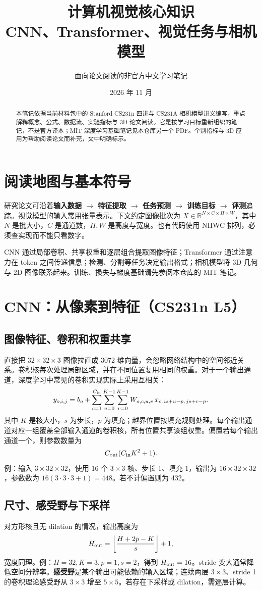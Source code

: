 \documentclass[11pt,a4paper,fontset=none]{ctexart}
\title{\vspace{-1.4cm}\textbf{计算机视觉核心知识}\\\large CNN、Transformer、视觉任务与相机模型}
\author{面向论文阅读的非官方中文学习笔记}
\date{2026 年 11 月}
\newcommand{\R}{\mathbb{R}}
\begin{document}
\maketitle
\begin{abstract}
本笔记依据当前材料包中的 Stanford CS231n 四讲与 CS231A 相机模型讲义编写，重点解释概念、公式、数据流、实验指标与 3D 论文阅读。它是按学习目标重新组织的笔记，不是官方译本；MIT 深度学习基础笔记见本仓库另一个 PDF。个别指标与 3D 应用为帮助阅读论文而补充，文中明确标示。
\end{abstract}
\setcounter{tocdepth}{1}
\tableofcontents\newpage
\section{阅读地图与基本符号}
研究论文可沿着\textbf{输入数据 $\to$ 特征提取 $\to$ 任务预测 $\to$ 训练目标 $\to$ 评测}追踪。视觉模型的输入常用张量表示。下文约定图像批次为 $X\in\R^{N\times C\times H\times W}$，其中 $N$ 是批大小，$C$ 是通道数，$H,W$ 是高度与宽度。也有代码使用 NHWC 排列，必须查实现而不能只看数字。

CNN 通过局部卷积、共享权重和逐层组合提取图像特征；Transformer 通过注意力在 token 之间传递信息；检测、分割等任务决定输出格式；相机模型将 3D 几何与 2D 图像联系起来。训练、损失与梯度基础请先参阅本仓库的 MIT 笔记。
\section{CNN：从像素到特征（CS231n L5）}
\subsection{图像特征、卷积和权重共享}
直接把 $32\times32\times3$ 图像拉直成 3072 维向量，会忽略网络结构中的空间邻近关系。卷积核每次处理局部区域，并在不同位置复用相同的权重。对于一个输出通道，深度学习中常见的卷积实现实际上采用互相关：
\[
y_{o,i,j}=b_o+\sum_{c=1}^{C_{\rm in}}\sum_{u=0}^{K-1}\sum_{v=0}^{K-1}W_{o,c,u,v}\,x_{c,\,is+u-p,\,js+v-p}.
\]
其中 $K$ 是核大小，$s$ 为步长，$p$ 为填充；越界位置按填充规则处理。每个输出通道对应一组覆盖全部输入通道的卷积核，所有位置共享该组权重。偏置若每个输出通道一个，则参数数量为
\[
C_{\rm out}(C_{\rm in}K^2+1).
\]
例：输入 $3\times32\times32$，使用 16 个 $3\times3$ 核、步长 1、填充 1，输出为 $16\times32\times32$，参数数为 $16(3\cdot3\cdot3+1)=448$。若不计偏置则为 432。
\subsection{尺寸、感受野与下采样}
对方形核且无 dilation 的情况，输出高度为
\[
H_{\rm out}=\left\lfloor\frac{H+2p-K}{s}\right\rfloor+1,
\]
宽度同理。例：$H=32,K=3,p=1,s=2$，得到 $H_{\rm out}=16$。stride 变大通常降低空间分辨率。\textbf{感受野}是某个输出可能依赖的输入区域；连续两层 $3\times3$、stride 1 的卷积理论感受野从 $3\times3$ 增至 $5\times5$。若存在下采样或 dilation，需逐层计算。
\end{document}
